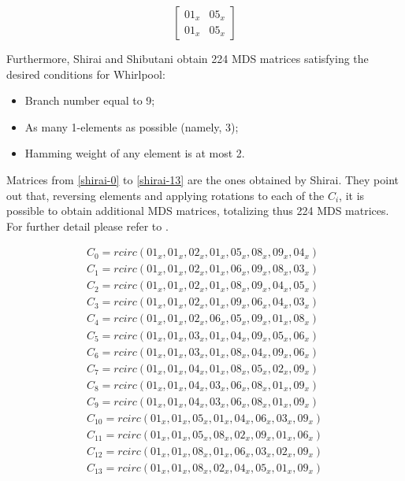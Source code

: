 \begin{equation}\label{mat:singular-whirlpool}
\begin{bmatrix}
  01_x & 05_x\\
  01_x & 05_x
\end{bmatrix}
\end{equation}

Furthermore, Shirai and Shibutani obtain 224 MDS matrices satisfying the desired conditions for Whirlpool:
\begin{itemize}
  \item Branch number equal to 9;
  \item As many 1-elements as possible (namely, 3);
  \item Hamming weight of any element is at most 2.
\end{itemize}

Matrices from \eqref{shirai-0} to \eqref{shirai-13} are the ones obtained by Shirai. They point out that, reversing elements and applying rotations to each of the $C_i$, it is possible to obtain additional MDS matrices, totalizing thus 224 MDS matrices. For further detail please refer to \cite{Shirai2003}.

\begin{gather}
C_0 = rcirc(01_x, 01_x, 02_x, 01_x, 05_x, 08_x, 09_x, 04_x)\label{shirai-0}\\
C_1 = rcirc(01_x, 01_x, 02_x, 01_x, 06_x, 09_x, 08_x, 03_x)\label{shirai-1}\\
C_2 = rcirc(01_x, 01_x, 02_x, 01_x, 08_x, 09_x, 04_x, 05_x)\label{shirai-2}\\
C_3 = rcirc(01_x, 01_x, 02_x, 01_x, 09_x, 06_x, 04_x, 03_x)\label{shirai-3}\\
C_4 = rcirc(01_x, 01_x, 02_x, 06_x, 05_x, 09_x, 01_x, 08_x)\label{shirai-4}\\
C_5 = rcirc(01_x, 01_x, 03_x, 01_x, 04_x, 09_x, 05_x, 06_x)\label{shirai-5}\\
C_6 = rcirc(01_x, 01_x, 03_x, 01_x, 08_x, 04_x, 09_x, 06_x)\label{shirai-6}\\
C_7 = rcirc(01_x, 01_x, 04_x, 01_x, 08_x, 05_x, 02_x, 09_x)\label{shirai-7}\\
C_8 = rcirc(01_x, 01_x, 04_x, 03_x, 06_x, 08_x, 01_x, 09_x)\label{shirai-8}\\
C_9 = rcirc(01_x, 01_x, 04_x, 03_x, 06_x, 08_x, 01_x, 09_x)\label{shirai-9}\\
C_{10} = rcirc(01_x, 01_x, 05_x, 01_x, 04_x, 06_x, 03_x, 09_x)\label{shirai-10}\\
C_{11} = rcirc(01_x, 01_x, 05_x, 08_x, 02_x, 09_x, 01_x, 06_x)\label{shirai-11}\\
C_{12} = rcirc(01_x, 01_x, 08_x, 01_x, 06_x, 03_x, 02_x, 09_x)\label{shirai-12}\\
C_{13} = rcirc(01_x, 01_x, 08_x, 02_x, 04_x, 05_x, 01_x, 09_x)\label{shirai-13}
\end{gather}
